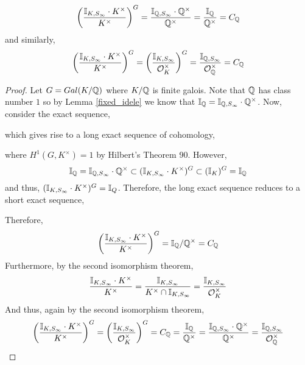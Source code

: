 \documentclass[12pt]{extarticle}
\begin{document}
\begin{lemma} \label{fixed_idele_subgroup}
\[ \left(\frac{\mathbb{I}_{K, S_\infty} \cdot K^\times}{K^\times} \right)^G = \frac{\mathbb{I}_{\mathbb{Q}, S_\infty} \cdot \mathbb{Q}^\times}{\mathbb{Q}^\times}  = \frac{\mathbb{I}_{\mathbb{Q}}}{\mathbb{Q}^\times} = C_{\mathbb{Q}} \]
and similarly,
\[ \left(\frac{\mathbb{I}_{K, S_\infty} \cdot K^\times}{K^\times} \right)^G = \left( \frac{\mathbb{I}_{K, S_\infty}}{\mathcal{O}_{K}^\times} \right)^G = \frac{\mathbb{I}_{\mathbb{Q}, S_\infty}}{\mathcal{O}_{\mathbb{Q}}^\times} = C_{\mathbb{Q}} \]
\end{lemma}

\begin{proof}
Let $G = Gal \small(K/\mathbb{Q} \small)$ where $K/\mathbb{Q}$ is finite galois. Note that $\mathbb{Q}$ has class number $1$ so by Lemma \ref{fixed_idele} we know that $\mathbb{I}_{\mathbb{Q}} = \mathbb{I}_{\mathbb{Q}, S_\infty} \cdot \mathbb{Q}^\times$. Now, consider the exact sequence, 
\begin{center}
\end{center}
which gives rise to a long exact sequence of cohomology,
\begin{center}
\end{center}
where $H^1(G, K^\times) = 1$ by Hilbert's Theorem 90. However,
\[ \mathbb{I}_{\mathbb{Q}} = \mathbb{I}_{\mathbb{Q}, S_\infty} \cdot \mathbb{Q}^\times \subset ( \mathbb{I}_{K, S_\infty} \cdot K^\times)^G \subset (\mathbb{I}_{K})^G = \mathbb{I}_{\mathbb{Q}} \]
and thus, $( \mathbb{I}_{K, S_\infty} \cdot K^\times )^G = \mathbb{I}_{Q}$.
Therefore, the long exact sequence reduces to a short exact sequence,
\begin{center}
\end{center}
Therefore, 
\[ \left( \frac{\mathbb{I}_{K, S_\infty} \cdot K^\times}{K^\times} \right)^G = \mathbb{I}_{\mathbb{Q}} / \mathbb{Q}^\times = C_{\mathbb{Q}} \]
Furthermore, by the second isomorphism theorem,
\[ \frac{\mathbb{I}_{K, S_\infty} \cdot K^\times}{K^\times} = \frac{\mathbb{I}_{K, S_\infty}}{K^\times \cap \mathbb{I}_{K, S_\infty}} = \frac{\mathbb{I}_{K, S_\infty}}{\mathcal{O}_{K}^\times} \]
And thus, again by the second isomorphism theorem,
\[ \left(\frac{\mathbb{I}_{K, S_\infty} \cdot K^\times}{K^\times} \right)^G = \left( \frac{\mathbb{I}_{K, S_\infty}}{\mathcal{O}_{K}^\times} \right)^G = C_{\mathbb{Q}} = \frac{\mathbb{I}_{\mathbb{Q}}}{\mathbb{Q}^\times} = \frac{\mathbb{I}_{\mathbb{Q}, S_\infty} \cdot \mathbb{Q}^\times}{\mathbb{Q}^\times} = \frac{\mathbb{I}_{\mathbb{Q}, S_\infty}}{\mathcal{O}_{\mathbb{Q}}^\times}  \]
\end{proof}
\end{document}
